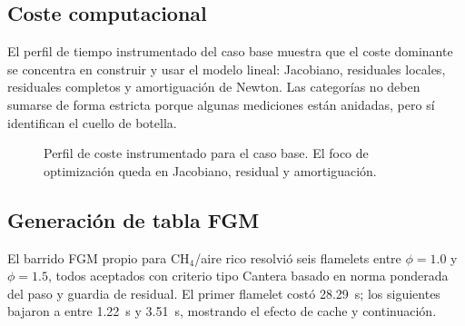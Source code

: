 \documentclass[12pt,a4paper]{article}
\begin{document}
\subsection{Coste computacional}

El perfil de tiempo instrumentado del caso base muestra que el coste dominante se concentra en construir y usar el modelo lineal: Jacobiano, residuales locales, residuales completos y amortiguación de Newton. Las categorías no deben sumarse de forma estricta porque algunas mediciones están anidadas, pero sí identifican el cuello de botella.

\begin{figure}[H]
  \centering
  \caption{Perfil de coste instrumentado para el caso base. El foco de optimización queda en Jacobiano, residual y amortiguación.}
  \label{fig:profile_time}
\end{figure}

\subsection{Generación de tabla FGM}

El barrido FGM propio para CH$_4$/aire rico resolvió seis flamelets entre $\phi=1.0$ y $\phi=1.5$, todos aceptados con criterio tipo Cantera basado en norma ponderada del paso y guardia de residual. El primer flamelet costó \SI{28.29}{s}; los siguientes bajaron a entre \SI{1.22}{s} y \SI{3.51}{s}, mostrando el efecto de cache y continuación.
\end{document}
